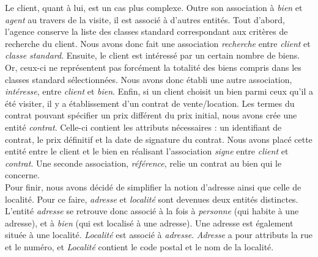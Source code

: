 Le client, quant à lui, est un cas plus complexe. Outre son association à \textit{bien} et \textit{agent} au travers de la visite, il est associé à d'autres entités. Tout d'abord, l'agence conserve la liste des classes standard correspondant aux critères de recherche du client. Nous avons donc fait une association \textit{recherche} entre \textit{client} et \textit{classe standard}.  Ensuite, le client est intéressé par un certain nombre de biens. Or, ceux-ci ne représentent pas forcément la totalité des biens compris dans les classes standard sélectionnées. Nous avons donc établi une autre association, \textit{intéresse}, entre \textit{client} et \textit{bien}. Enfin, si un client choisit un bien parmi ceux qu'il a été visiter, il y a établissement d'un contrat de vente/location. Les termes du contrat pouvant spécifier un prix différent du prix initial, nous avons crée une entité \textit{contrat}. Celle-ci contient les attributs nécessaires : un identifiant de contrat, le prix définitif et la date de signature du contrat. Nous avons placé cette entité entre le client et le bien en réalisant l'association \textit{signe} entre \textit{client} et \textit{contrat}. Une seconde association, \textit{référence}, relie un contrat au bien qui le concerne.\\

Pour finir, nous avons décidé de simplifier la notion d'adresse ainsi que celle de localité. Pour ce faire, \textit{adresse} et \textit{localité} sont devenues deux entités distinctes. L'entité \textit{adresse} se retrouve donc associé à la fois à \textit{personne} (qui habite à une adresse), et à \textit{bien} (qui est localisé à une adresse). Une adresse est également située à une localité. \textit{Localité} est associé à \textit{adresse}. \textit{Adresse} a pour attributs la rue et le numéro, et \textit{Localité} contient le code postal et le nom de la localité.

